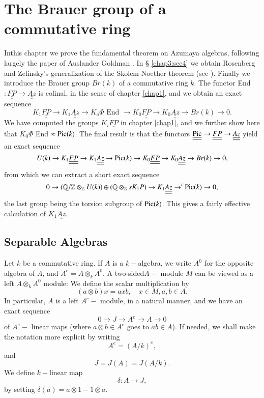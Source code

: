 \chapter{The Brauer group of a commutative ring}\label{chap3} %

In\pageoriginale this chapter we prove the fundamental theorem on
Azumaya algebras, 
following largely the paper of Auslander Goldman \cite{key1}. In \S
\ref{chap3:sec4} we 
obtain Rosenberg and Zelinsky's	generalization of the Skolem-Noether
theorem (see \cite{key1}). Finally we introduce the Brauer group $Br (k)$ of
a commutative ring $k$. The functor End $: \underline{\underline{FP}}
\rightarrow \underline{\underline{Az}}$ is cofinal, in the sense of
chapter \ref{chap1}, and we obtain an exact sequence 
$$
K_1\underline{\underline{FP}} \to K_1\underline{\underline{Az}} \to 
K_o \Phi \text{ End } \to K_0 \underline{\underline{FP}} \to K_0
\underline{\underline{Az}} \to Br (k) \to 0. 
$$
We have computed the groups $K_i \underline{\underline{FP}}$ in
chapter \ref{chap1}, and we further show here that $K_0 \Phi$ End $\approx \operatorname{Pic}
(k)$. The final result is that the functors
$\underline{\underline{\operatorname{Pic}}} \to \underline{\underline{FP}} \to
\underline{\underline{Az}} $ yield an exact sequence 
$$
U(k) \to K_1 \underline{\underline{FP}} \to K_1
\underline{\underline{Az}} \to \operatorname{Pic} (k) \to K_0
\underline{\underline{FP}} \to K_0 \underline{\underline{Az}} \to Br
(k) \to 0, 
$$
from which we can extract a short exact sequence 
$$
0 \to (\mathbb{Q}/ \mathbb{Z} \otimes_{\mathbb{Z}} U (k)) \oplus
(\mathbb{Q} \otimes_{\mathbb{Z}} sK_1P) \to K_1
\underline{\underline{Az}} \to^t \operatorname{Pic} (k) \to 0, 
$$
the last group being the torsion subgroup of $\operatorname{Pic} (k)$. This gives a
fairly effective calculation of $K_1 \underline{\underline{Az}}$. 


\section{Separable Algebras}\label{chap3:sec1}%

Let $k$ be a commutative ring. If $A$ is a $k-$algebra, we write
$A^0$ for the opposite algebra of $A$, and $A^e = A \otimes_k A^0$. A
two-sided\pageoriginale $A-$ module $M$ can be viewed as a left $A
\otimes_k A^0$ module: We define the scalar multiplication by  
$$
(a \otimes b)x = axb, \quad x \in M, a,b \in A.
$$
In particular, $A$ is a left $A^e-$ module, in a natural manner, and
we have an exact sequence 
\begin{equation*}
0 \to J \to A^e \to A \to 0 \tag{1.1}
\end{equation*}
of $A^e-$ linear maps (where $a \otimes b \in A^e$ goes to $ab \in
A$). If needed, we shall make the notation more explicit by writing 
$$
A^e = (A/k)^e,
$$
and  
$$
J = J (A) = J (A/k).
$$
We define $k-$linear map
$$
\delta : A \to J, 
$$
by setting $\delta(a) = a \otimes 1 - 1 \otimes a$. 

